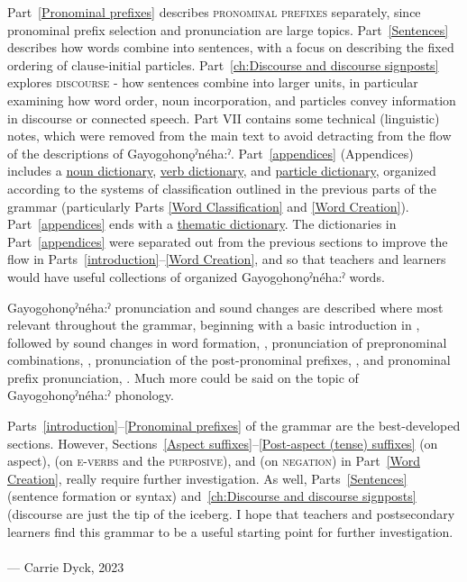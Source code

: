 Part~\ref{Pronominal prefixes} describes \textsc{pronominal prefixes} separately, since pronominal prefix selection and pronunciation are large topics. Part~\ref{Sentences} describes how words combine into sentences, with a focus on describing the fixed ordering of clause-initial particles. Part~\ref{ch:Discourse and discourse signposts} explores \textsc{discourse} - how sentences combine into larger units, in particular examining how word order, noun incorporation, and particles convey information in discourse or connected speech. Part VII contains some technical (linguistic) notes, which were removed from the main text to avoid detracting from the flow of the descriptions of Gayogo̱honǫˀnéha:ˀ. Part~\ref{appendices} (Appendices) includes a \hyperlink{ch:noun dictionary}{noun dictionary}, \hyperlink{verb dictionary}{verb dictionary}, and \hyperlink{ch:particle dictionary}{particle dictionary}, organized according to the systems of classification outlined in the previous parts of the grammar (particularly Parts \ref{Word Classification} and \ref{Word Creation}). Part~\ref{appendices} ends with a \hyperlink{thematic dictionary}{thematic dictionary}. The dictionaries in Part~\ref{appendices} were separated out from the previous sections to improve the flow in Parts~\ref{introduction}--\ref{Word Creation}, and so that teachers and learners would have useful collections of organized Gayogo̱honǫˀnéha:ˀ words.

Gayogo̱honǫˀnéha:ˀ pronunciation and sound changes are described where most relevant throughout the grammar, beginning with a basic introduction in , followed by sound changes in word formation, , pronunciation of prepronominal combinations, , pronunciation of the post-pronominal prefixes, , and pronominal prefix pronunciation, . Much more could be said on the topic of Gayogo̱honǫˀnéha:ˀ phonology. 

Parts~\ref{introduction}--\ref{Pronominal prefixes} of the grammar are the best-developed sections. However, Sections~\ref{Aspect suffixes}--\ref{Post-aspect (tense) suffixes} (on aspect),  (on \textsc{e-verbs} and the \textsc{purposive}), and  (on \textsc{negation}) in Part~\ref{Word Creation}, really require further investigation. As well, Parts~\ref{Sentences} (sentence formation or syntax) and~\ref{ch:Discourse and discourse signposts} (discourse are just the tip of the iceberg. I hope that teachers and postsecondary learners find this grammar to be a useful starting point for further investigation.\\\\
\noindent --- Carrie Dyck, 2023
